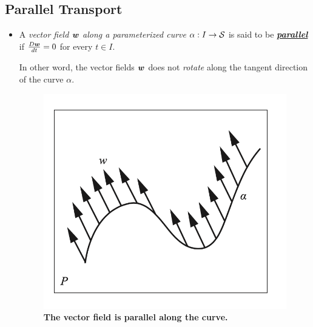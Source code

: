 \documentclass[11pt]{article}
\begin{document}
\subsection{Parallel Transport}
\begin{itemize}
\item \begin{definition}
A \emph{vector field} $\boldsymbol{w}$ \emph{along a parameterized curve} $\alpha: I \rightarrow {\mathcal S}$ is said to be \underline{\emph{\textbf{parallel}}} if $\frac{D\boldsymbol{w}}{dt} = 0$ for every $t\in I$.  
\end{definition} In other word, the vector fields $\boldsymbol{w}$ does not \emph{rotate} along the tangent direction of the curve $\alpha$.

\begin{figure}[tb]
\centering
\begin{minipage}{0.6\linewidth}
 \centerline{\includegraphics[scale = 0.43]{para_transp0.png}}
\end{minipage}
\caption{\scriptsize
\textbf{The vector field is parallel along the curve.}}
\label{fig: para_transp0}
\end{figure}


\end{itemize}
\end{document}
